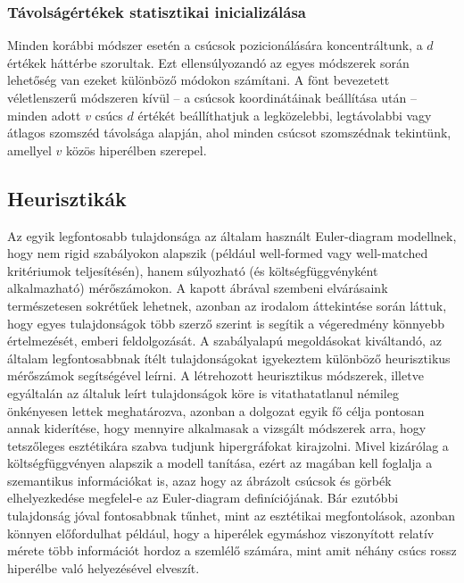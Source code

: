 \subsubsection{Távolságértékek statisztikai inicializálása} \label{initialization_d}

Minden korábbi módszer esetén a csúcsok pozicionálására koncentráltunk, a $d$ értékek háttérbe szorultak. Ezt ellensúlyozandó az egyes módszerek során lehetőség van ezeket különböző módokon számítani. A fönt bevezetett véletlenszerű módszeren kívül -- a csúcsok koordinátáinak beállítása után -- minden adott $v$ csúcs $d$ értékét beállíthatjuk a legközelebbi, legtávolabbi vagy átlagos szomszéd távolsága alapján, ahol minden csúcsot szomszédnak tekintünk, amellyel $v$ közös hiperélben szerepel.





\subsection{Heurisztikák} \label{heuristics}

Az egyik legfontosabb tulajdonsága az általam használt Euler-diagram modellnek, hogy nem rigid szabályokon alapszik (például well-formed vagy well-matched kritériumok teljesítésén), hanem súlyozható (és költségfüggvényként alkalmazható) mérőszámokon. A kapott ábrával szembeni elvárásaink természetesen sokrétűek lehetnek, azonban az irodalom áttekintése során láttuk, hogy egyes tulajdonságok több szerző szerint is segítik a végeredmény könnyebb értelmezését, emberi feldolgozását. A szabályalapú megoldásokat kiváltandó, az általam legfontosabbnak ítélt tulajdonságokat igyekeztem különböző heurisztikus mérőszámok segítségével leírni. A létrehozott heurisztikus módszerek, illetve egyáltalán az általuk leírt tulajdonságok köre is vitathatatlanul némileg önkényesen lettek meghatározva, azonban a dolgozat egyik fő célja pontosan annak kiderítése, hogy mennyire alkalmasak a vizsgált módszerek arra, hogy tetszőleges esztétikára szabva tudjunk hipergráfokat kirajzolni. Mivel kizárólag a költségfüggvényen alapszik a modell tanítása, ezért az magában kell foglalja a szemantikus információkat is, azaz hogy az ábrázolt csúcsok és görbék elhelyezkedése megfelel-e az Euler-diagram definíciójának. Bár ezutóbbi tulajdonság jóval fontosabbnak tűnhet, mint az esztétikai megfontolások, azonban könnyen előfordulhat például, hogy a hiperélek egymáshoz viszonyított relatív mérete több információt hordoz a szemlélő számára, mint amit néhány csúcs rossz hiperélbe való helyezésével elveszít.


